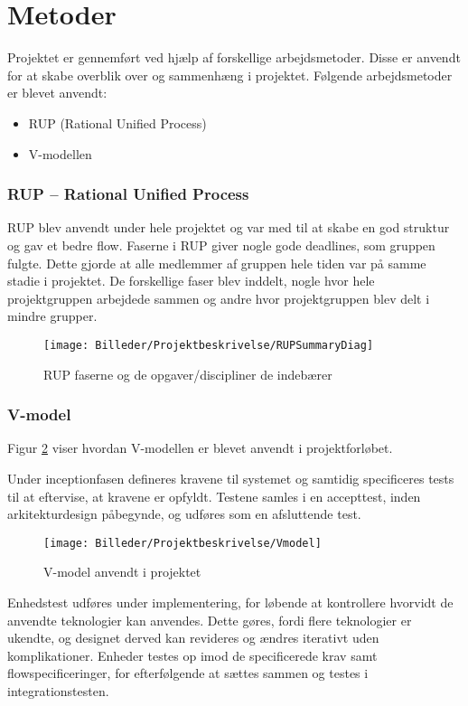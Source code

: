 \section{Metoder}
\label{chap:metoder}

Projektet er gennemført ved hjælp af forskellige arbejdsmetoder. Disse er anvendt for at skabe overblik over og sammenhæng i projektet. Følgende arbejdsmetoder er blevet anvendt:

\begin{itemize}
	\item RUP (Rational Unified Process)
	\item V-modellen
\end{itemize}

\subsubsection*{RUP -- Rational Unified Process}
RUP blev anvendt under hele projektet og var med til at skabe en god struktur og gav et bedre flow.
Faserne i RUP giver nogle gode deadlines, som gruppen fulgte. Dette gjorde at alle medlemmer af gruppen hele tiden var på samme stadie i projektet. De forskellige faser blev inddelt, nogle hvor hele projektgruppen arbejdede sammen og andre hvor projektgruppen blev delt i mindre grupper.
\begin{figure}[H]
\centering
\texttt{[image: Billeder/Projektbeskrivelse/RUPSummaryDiag]}
\caption{RUP faserne og de opgaver/discipliner de indebærer}
\label{fig:RUP_diagram}
\end{figure}




\subsubsection*{V-model}
Figur \ref{fig:V_model} viser hvordan V-modellen er blevet anvendt i projektforløbet.

Under inceptionfasen defineres kravene til systemet og samtidig specificeres tests til at eftervise, at kravene er opfyldt. Testene samles i en accepttest, inden arkitekturdesign påbegynde, og udføres som en afsluttende test.

\begin{figure}[htb]
	\centering
	\texttt{[image: Billeder/Projektbeskrivelse/Vmodel]}
	\caption{V-model anvendt i projektet}
	\label{fig:V_model}
\end{figure}

Enhedstest udføres under implementering, for løbende at kontrollere hvorvidt de anvendte teknologier kan anvendes. Dette gøres, fordi flere teknologier er ukendte, og designet derved kan revideres og ændres iterativt uden komplikationer. Enheder testes op imod de specificerede krav samt flowspecificeringer, for efterfølgende at sættes sammen og testes i integrationstesten.